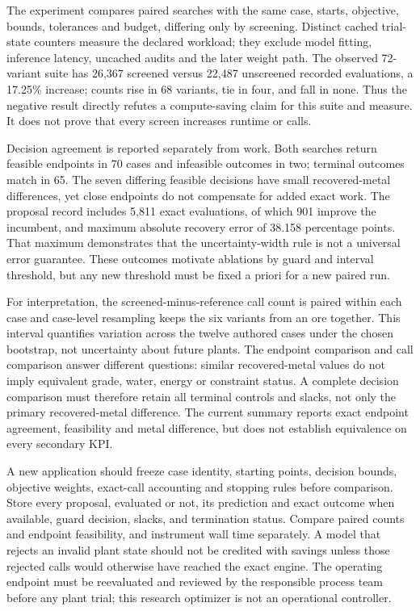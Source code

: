 \documentclass[10pt]{article}
\begin{document}
The experiment compares paired searches with the same case, starts,
objective, bounds, tolerances and budget, differing only by screening.
Distinct cached trial-state counters measure the declared workload; they
exclude model fitting, inference latency, uncached audits and the later
weight path. The observed 72-variant suite has 26,367 screened versus
22,487 unscreened recorded evaluations, a 17.25\% increase; counts rise
in 68 variants, tie in four, and fall in none. Thus the negative result
directly refutes a compute-saving claim for this suite and measure. It
does not prove that every screen increases runtime or calls.

Decision agreement is reported separately from work. Both searches
return feasible endpoints in 70 cases and infeasible outcomes in two;
terminal outcomes match in 65. The seven differing feasible decisions
have small recovered-metal differences, yet close endpoints do not
compensate for added exact work. The proposal record includes 5,811
exact evaluations, of which 901 improve the incumbent, and maximum
absolute recovery error of 38.158 percentage points. That maximum
demonstrates that the uncertainty-width rule is not a universal error
guarantee. These outcomes motivate ablations by guard and interval
threshold, but any new threshold must be fixed a priori for a new paired
run.

For interpretation, the screened-minus-reference call count is paired
within each case and case-level resampling keeps the six variants from an
ore together. This interval quantifies variation across the twelve
authored cases under the chosen bootstrap, not uncertainty about future
plants. The endpoint comparison and call comparison answer different
questions: similar recovered-metal values do not imply equivalent grade,
water, energy or constraint status. A complete decision comparison must
therefore retain all terminal controls and slacks, not only the primary
recovered-metal difference. The current summary reports exact endpoint
agreement, feasibility and metal difference, but does not establish
equivalence on every secondary KPI.

A new application should freeze case identity, starting points, decision
bounds, objective weights, exact-call accounting and stopping rules
before comparison. Store every proposal, evaluated or not, its
prediction and exact outcome when available, guard decision, slacks, and
termination status. Compare paired counts and endpoint feasibility, and
instrument wall time separately. A model that rejects an invalid plant
state should not be credited with savings unless those rejected calls
would otherwise have reached the exact engine. The operating endpoint
must be reevaluated and reviewed by the responsible process team before
any plant trial; this research optimizer is not an operational
controller.
\end{document}
